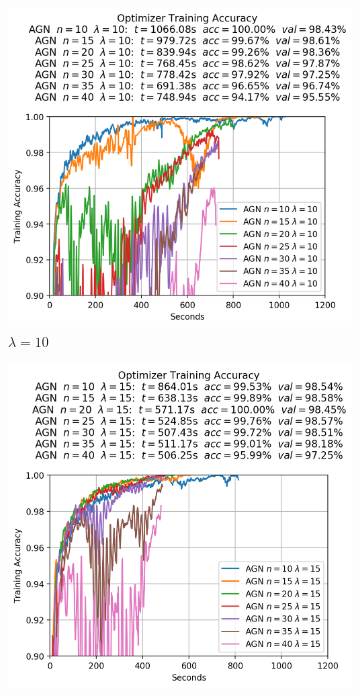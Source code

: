 \begin{figure}
  \centering
  \begin{subfigure}{.3\textwidth}
    \centering
    \includegraphics[width=\linewidth]{resources/images/agn_experiments_lambda_10}
    \caption{$\lambda = 10$}
  \end{subfigure}
  \begin{subfigure}{.3\textwidth}
    \centering
    \includegraphics[width=\linewidth]{resources/images/agn_experiments_lambda_15}

\end{subfigure}
\end{figure}
